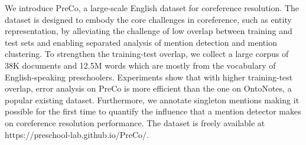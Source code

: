 We introduce PreCo, a large-scale English dataset for coreference resolution. The dataset is designed to embody the core challenges in coreference, such as entity representation, by alleviating the challenge of low overlap between training and test sets and enabling separated analysis of mention detection and mention clustering. To strengthen the training-test overlap, we collect a large corpus of 38K documents and 12.5M words which are mostly from the vocabulary of English-speaking preschoolers. Experiments show that with higher training-test overlap, error analysis on PreCo is more efficient than the one on OntoNotes, a popular existing dataset. Furthermore, we annotate singleton mentions making it possible for the first time to quantify the influence that a mention detector makes on coreference resolution performance. The dataset is freely available at https://preschool-lab.github.io/PreCo/.

